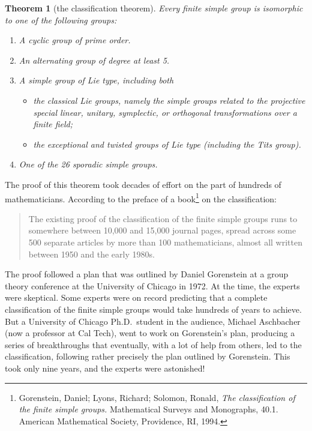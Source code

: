 \documentclass[11pt,oneside]{article}
\newtheorem{thm}{Theorem}[section]
\theoremstyle{definition}
\begin{document}
\begin{thm}[the classification theorem]
%
  Every finite simple group is isomorphic to one of the following
  groups:
 \begin{enumerate}
 \item A cyclic group of prime order.
 \item An alternating group of degree at least 5.
 \item A simple group of Lie type, including both 
   \begin{itemize}
   \item the classical Lie groups, namely the simple groups related to
     the projective special linear, unitary, symplectic, or orthogonal
     transformations over a finite field;
   \item the exceptional and twisted groups of Lie type (including the
     Tits group).
   \end{itemize}
 \item One of the 26 sporadic simple groups.
 \end{enumerate}
\end{thm}



The proof of this theorem took decades of effort on the part of
hundreds of mathematicians.  According to the preface of a
book\footnote{Gorenstein, Daniel; Lyons, Richard; Solomon, Ronald,
  \emph{The classification of the finite simple groups.}  Mathematical
  Surveys and Monographs, 40.1. American Mathematical Society,
  Providence, RI, 1994.} on the classification:
\begin{quote}
  The existing proof of the classification of the finite simple groups
  runs to somewhere between 10,000 and 15,000 journal pages, spread
  across some 500 separate articles by more than 100 mathematicians,
  almost all written between 1950 and the early 1980s.
\end{quote}
The proof followed a plan that was outlined by Daniel Gorenstein at a
group theory conference at the University of Chicago in 1972. At the
time, the experts were skeptical.  Some experts were on record
predicting that a complete classification of the finite simple groups
would take hundreds of years to achieve.  But a University of Chicago
Ph.D.\ student in the audience, Michael Aschbacher (now a professor at
Cal Tech), went to work on Gorenstein's plan, producing a series of
breakthroughs that eventually, with a lot of help from others, led to
the classification, following rather precisely the plan outlined by
Gorenstein. This took only nine years, and the experts were
astonished!
\end{document}

